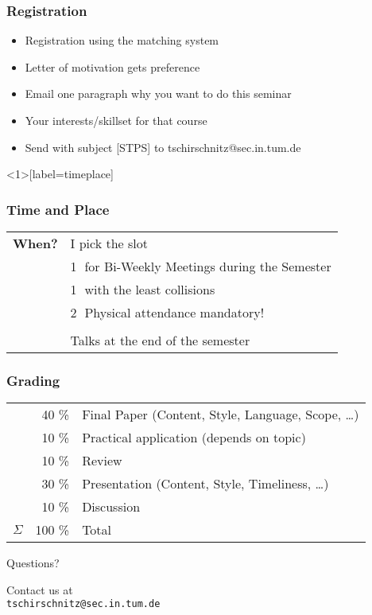 \documentclass[xcolor={usenames,dvipsnames}]{beamer}
\begin{document}
\begin{frame}
	\frametitle{Registration}
	\begin{itemize}
		\item Registration using the \alert{matching system}
	  	\item Letter of motivation gets preference
	  	\item Email \alert{one paragraph} why you want to do this seminar
	  	\item Your interests/skillset for that course
	  	\item Send \alert{with subject} [STPS] to tschirschnitz@sec.in.tum.de 
	\end{itemize}
\end{frame}

\begin{frame}<1>[label=timeplace]
	\frametitle{Time and Place}
	\begin{center}
		\begin{tabular}{ll}
		        \textbf{When?}  & I pick the slot\\
		        						&\textcircled{1} for Bi-Weekly Meetings during the Semester\\
		        						&\textcircled{1} with the least collisions\\
		        						&\textcircled{2} Physical attendance mandatory!\\
					&\\
					& Talks at the \alert{end} of the semester \\
		\end{tabular}
	\end{center}
\end{frame}


\begin{frame}
\frametitle{Grading}
  \begin{tabular}{lrl}
             & \alert{40 \%}   & Final Paper (Content, Style, Language, Scope, \ldots)\\
	     		 & \alert{10 \%}   & Practical application (depends on topic)  \\
             & \alert{10 \%}   & Review      \\
             & \alert{30 \%}   & Presentation (Content, Style, Timeliness, \ldots) \\
             & \alert{10 \%}   & Discussion                                                   \\
    \midrule
	$\Sigma$ & \alert{100 \%}  & Total                                                        \\
  \end{tabular}
\end{frame}

\begin{frame}
	\begin{center}
		{\huge Questions?}

		\vspace{2cm}

		\begin{center}
			Contact us at \\ \texttt{tschirschnitz@sec.in.tum.de}
		\end{center}

		\vspace{1cm}
	\end{center}
\end{frame}
\end{document}
